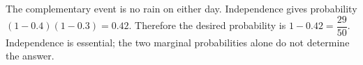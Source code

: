 The complementary event is no rain on either day. Independence gives probability $(1-0.4)(1-0.3)=0.42$. Therefore the desired probability is $1-0.42=\boxed{\dfrac{29}{50}}$. Independence is essential; the two marginal probabilities alone do not determine the answer.
